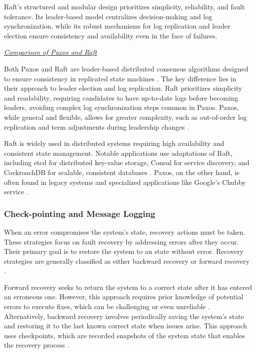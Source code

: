 Raft’s structured and modular design prioritizes simplicity, reliability, and fault tolerance. Its leader-based model centralizes decision-making and log synchronization, while its robust mechanisms for log replication and leader election ensure consistency and availability even in the face of failures.

\textit{\underline{Comparison of Paxos and Raft}}

Both Paxos and Raft are leader-based distributed consensus algorithms designed to ensure consistency in replicated state machines \cite{Howard2020}. The key difference lies in their approach to leader election and log replication. Raft prioritizes simplicity and readability, requiring candidates to have up-to-date logs before becoming leaders, avoiding complex log synchronization steps common in Paxos. Paxos, while general and flexible, allows for greater complexity, such as out-of-order log replication and term adjustments during leadership changes \cite{Tanenbaum2023}.

Raft is widely used in distributed systems requiring high availability and consistent state management. Notable applications use adaptations of Raft, including etcd for distributed key-value storage, Consul for service discovery, and CockroachDB for scalable, consistent databases \cite{Howard2020,Vitillo2021}. Paxos, on the other hand, is often found in legacy systems and specialized applications like Google’s Chubby service \cite{Howard2020}.

\subsubsection{Check-pointing and Message Logging}

When an error compromises the system’s state, recovery actions must be taken. These strategies focus on fault recovery by addressing errors after they occur. Their primary goal is to restore the system to an state without error. Recovery strategies are generally classified as either backward recovery or forward recovery \cite{Tanenbaum2023}.

Forward recovery seeks to return the system to a correct state after it has entered an erroneous one. However, this approach requires prior knowledge of potential errors to execute fixes, which can be challenging or even unreliable \cite{Tanenbaum2023}. Alternatively, backward recovery involves periodically saving the system’s state and restoring it to the last known correct state when issues arise. This approach uses checkpoints, which are recorded snapshots of the system state that enables the recovery process \cite{Tanenbaum2023}.

